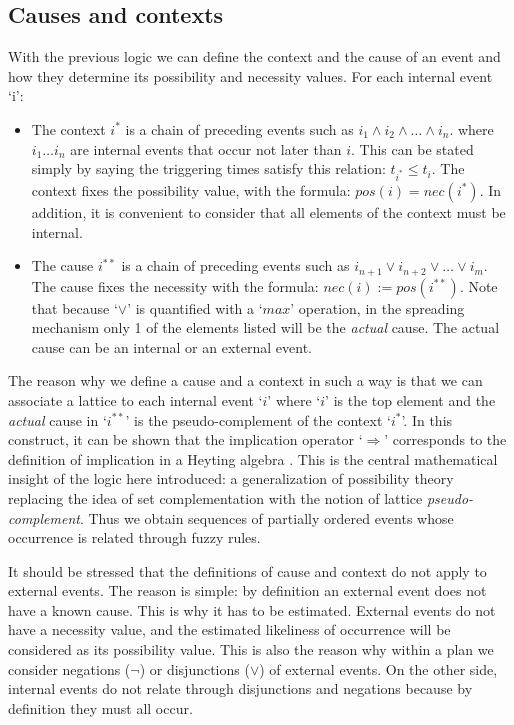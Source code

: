 \documentclass[
		twoside,openright,titlepage,numbers=noenddot,manychapters,
		headinclude,%
                footinclude=false,cleardoublepage=empty,
                BCOR=5mm,
		fontsize=11pt, %
                 enabledeprecatedfontcommands]{scrreprt}
\begin{document}
\subsection{Causes and contexts}
\label{caus_and_cont}
With the previous logic we can define the context and the cause of an event and how they determine its possibility and necessity values. For each internal event ‘i’:
\begin{itemize}
\item
	The context $i^*$ is a chain of preceding events such as $i_1\wedge i_2\wedge… \wedge i_n$. where $i_1 … i_n$ are internal events that occur not later than $i$. This can be stated simply by saying the triggering times satisfy this relation: $t_{i^*} \leq t_i $.
The context fixes the possibility value, with the formula: $pos(i) = nec(i^*)$. In addition, it is convenient to consider that all elements of the context must be internal.

\item	The cause $i^{**}$ is a chain of preceding events such as $i_{n+1} \vee i_{n+2} \vee … \vee i_m$. The cause fixes the necessity with the formula: $nec(i):= pos(i^{**})$. Note that because ‘$\vee$’ is quantified with a ‘$max$’ operation, in the spreading mechanism only 1 of the elements listed will be the \emph{actual} cause. The actual cause can be an internal or an external event.
\end{itemize}


The reason why we define a cause and a context in such a way is that we can associate a lattice to each internal event ‘$i$’ where ‘$i$’ is the top element and the \emph{actual} cause in ‘$i^{**}$’ is the pseudo-complement of the context ‘$i^*$’. In this construct, it can be shown that the implication operator ‘$\Rightarrow$’ corresponds to the definition of implication in a Heyting algebra \cite[]{rutherford1965ilt}. This is the central mathematical insight of the logic here introduced: a generalization of possibility theory replacing the idea of set complementation with the notion of lattice \emph{pseudo-complement}.
 Thus we obtain sequences of partially ordered events whose occurrence is related through fuzzy rules.

It should be stressed that the definitions of cause and context do not apply to external events. The reason is simple: by definition an external event does not have a known cause. This is why it has to be estimated. External events do not have a necessity value, and the estimated likeliness of occurrence will be considered as its possibility value. This is also the reason why within a plan we consider negations ($ \neg$) or disjunctions ($\vee$) of external events. On the other side, internal events do not relate through disjunctions and negations because by definition they must all occur. 
\end{document}
